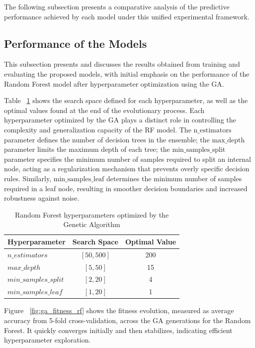 \documentclass[conference]{IEEEtran}
\begin{document}
The following subsection presents a comparative analysis of the predictive performance achieved by each model under this unified experimental framework.


\subsection{Performance of the Models}
\label{sec:performance_models}

This subsection presents and discusses the results obtained from training and evaluating the proposed models, with initial emphasis on the performance of the Random Forest model after hyperparameter optimization using the GA.

Table ~\ref{tab:rf_hyperparameters} shows the search space defined for each hyperparameter, as well as the optimal values found at the end of the evolutionary process. Each hyperparameter optimized by the GA plays a distinct role in controlling the complexity and generalization capacity of the RF model. The $\text{n\_estimators}$ parameter defines the number of decision trees in the ensemble; the $\text{max\_depth}$ parameter limits the maximum depth of each tree; the $\text{min\_samples\_split}$ parameter specifies the minimum number of samples required to split an internal node, acting as a regularization mechanism that prevents overly specific decision rules. Similarly, $\text{min\_samples\_leaf}$ determines the minimum number of samples required in a leaf node, resulting in smoother decision boundaries and increased robustness against noise. 

\begin{table}[ht]
\centering
\caption{Random Forest hyperparameters optimized by the Genetic Algorithm}
\label{tab:rf_hyperparameters}
\begin{tabular}{lcc}
\hline
\textbf{Hyperparameter} & \textbf{Search Space} & \textbf{Optimal Value} \\
\hline
$n\_estimators$      & $[50, 500]$          & 200   \\
$max\_depth$         & $[5, 50]$            & 15    \\
$min\_samples\_split$& $[2, 20]$            & 4     \\
$min\_samples\_leaf$ & $[1, 20]$            & 1     \\
\hline
\end{tabular}
\end{table}

Figure ~\ref{fig:ga_fitness_rf} shows the fitness evolution, measured as average accuracy from 5-fold cross-validation, across the GA generations for the Random Forest. It quickly converges initially and then stabilizes, indicating efficient hyperparameter exploration.
\end{document}
